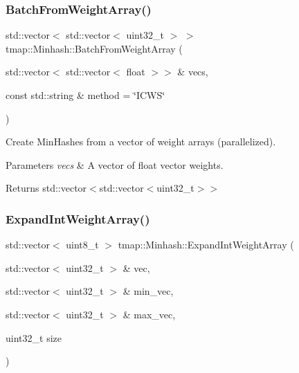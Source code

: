 \subsubsection{\texorpdfstring{Batch\+From\+Weight\+Array()}{BatchFromWeightArray()}}
{\footnotesize\ttfamily std\+::vector$<$ std\+::vector$<$ uint32\+\_\+t $>$ $>$ tmap\+::\+Minhash\+::\+Batch\+From\+Weight\+Array (\begin{DoxyParamCaption}\item[{std\+::vector$<$ std\+::vector$<$ float $>$$>$ \&}]{vecs,  }\item[{const std\+::string \&}]{method = {\ttfamily \char`\"{}ICWS\char`\"{}} }\end{DoxyParamCaption})}



Create Min\+Hashes from a vector of weight arrays (parallelized). 


\begin{DoxyParams}{Parameters}
{\em vecs} & A vector of float vector weights. \\
\hline
\end{DoxyParams}
\begin{DoxyReturn}{Returns}
std\+::vector$<$std\+::vector$<$uint32\+\_\+t$>$$>$ 
\end{DoxyReturn}
\mbox{\label{classtmap_1_1Minhash_a5419c90e01785149b570f94308e82430}} 
\subsubsection{\texorpdfstring{Expand\+Int\+Weight\+Array()}{ExpandIntWeightArray()}}
{\footnotesize\ttfamily std\+::vector$<$ uint8\+\_\+t $>$ tmap\+::\+Minhash\+::\+Expand\+Int\+Weight\+Array (\begin{DoxyParamCaption}\item[{std\+::vector$<$ uint32\+\_\+t $>$ \&}]{vec,  }\item[{std\+::vector$<$ uint32\+\_\+t $>$ \&}]{min\+\_\+vec,  }\item[{std\+::vector$<$ uint32\+\_\+t $>$ \&}]{max\+\_\+vec,  }\item[{uint32\+\_\+t}]{size }\end{DoxyParamCaption})}



